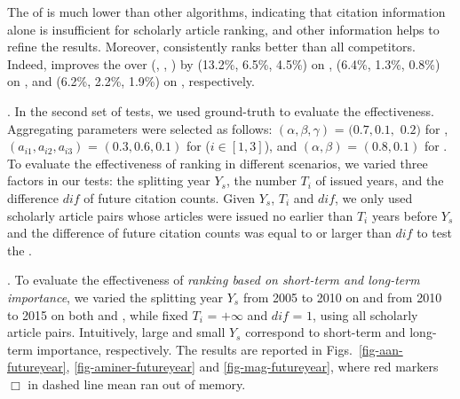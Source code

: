 The \PairAcc of \pagerank is much lower than other algorithms, indicating that citation information alone is insufficient for scholarly article ranking, and other information helps to refine the results. Moreover, \ensemblerank consistently ranks better than all competitors. Indeed, \ensemblerank improves the \PairAcc over (\pagerank, \futurerank, \hhgrank) by (13.2\%, 6.5\%, 4.5\%) on \aan, (6.4\%, 1.3\%, 0.8\%) on \aminer, and (6.2\%, 2.2\%, 1.9\%) on \magdata, respectively.

.
In the second set of tests, we used ground-truth \fcita to evaluate the effectiveness.
Aggregating parameters were selected as follows: $(\alpha, \beta, \gamma)$ = $(0.7, 0.1,$ $0.2)$ for \futurerank, $(a_{i1}, a_{i2}, a_{i3})$ = $(0.3, 0.6, 0.1)$ for \hhgrank ($i\in[1, 3]$), and $(\alpha, \beta)$ = $(0.8, 0.1)$ for \ensemblerank.
To evaluate the effectiveness of ranking in different scenarios, we varied three factors in our tests: the splitting year $Y_s$, the number $T_i$ of issued years, and the difference $dif$ of future citation counts.
%
Given $Y_s$, $T_i$ and $dif$, we only used scholarly article pairs whose articles were issued no earlier than $T_i$ years before $Y_s$ and the difference of future citation counts was equal to or larger than $dif$ to test the \PairAcc.


.
To evaluate the effectiveness of {\em ranking based on short-term and long-term importance},
we varied the splitting year $Y_s$ from 2005 to 2010 on \aan and from 2010 to 2015 on both \aminer and \magdata, while fixed $T_i$ = $+\infty$ and $dif$ = $1$, \ie using all scholarly article pairs.
%
Intuitively, large and small $Y_s$ correspond to short-term and long-term importance, respectively.
The results are reported in Figs.~\ref{fig-aan-futureyear}, \ref{fig-aminer-futureyear} and \ref{fig-mag-futureyear}, where red markers $\Box$ in dashed line mean \hhgrank ran out of memory.


